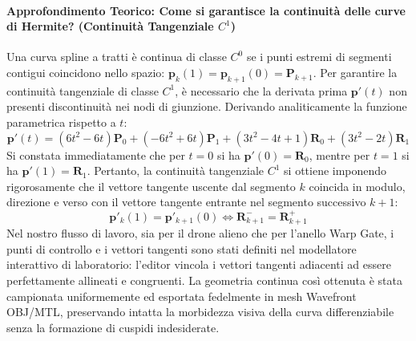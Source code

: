 \documentclass[11pt,a4paper]{article}
\begin{document}
\paragraph{Approfondimento Teorico: Come si garantisce la continuità delle curve di Hermite? (Continuità Tangenziale $C^1$)}
Una curva spline a tratti è continua di classe $C^0$ se i punti estremi di segmenti contigui coincidono nello spazio: $\mathbf{p}_k(1) = \mathbf{p}_{k+1}(0) = \mathbf{P}_{k+1}$. 
Per garantire la continuità tangenziale di classe $C^1$, è necessario che la derivata prima $\mathbf{p}'(t)$ non presenti discontinuità nei nodi di giunzione. 
Derivando analiticamente la funzione parametrica rispetto a $t$:
\begin{equation}
\mathbf{p}'(t) = (6t^2 - 6t)\mathbf{P}_0 + (-6t^2 + 6t)\mathbf{P}_1 + (3t^2 - 4t + 1)\mathbf{R}_0 + (3t^2 - 2t)\mathbf{R}_1
\end{equation}
Si constata immediatamente che per $t = 0$ si ha $\mathbf{p}'(0) = \mathbf{R}_0$, mentre per $t = 1$ si ha $\mathbf{p}'(1) = \mathbf{R}_1$. 
Pertanto, la continuità tangenziale $C^1$ si ottiene imponendo rigorosamente che il vettore tangente uscente dal segmento $k$ coincida in modulo, direzione e verso con il vettore tangente entrante nel segmento successivo $k+1$:
\begin{equation}
\mathbf{p}'_k(1) = \mathbf{p}'_{k+1}(0) \iff \mathbf{R}_{k+1}^- = \mathbf{R}_{k+1}^+
\end{equation}
Nel nostro flusso di lavoro, sia per il drone alieno che per l'anello Warp Gate, i punti di controllo e i vettori tangenti sono stati definiti nel modellatore interattivo di laboratorio: l'editor vincola i vettori tangenti adiacenti ad essere perfettamente allineati e congruenti. La geometria continua così ottenuta è stata campionata uniformemente ed esportata fedelmente in mesh Wavefront OBJ/MTL, preservando intatta la morbidezza visiva della curva differenziabile senza la formazione di cuspidi indesiderate.
\end{document}
